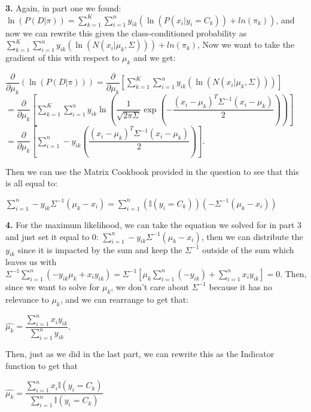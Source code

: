 \documentclass[submit]{harvardml}
\begin{document}
 \textbf{3.} Again, in part one we found: $\ln(P(D | \pi)) = \sum_{k=1}^{K} \sum_{i=1}^{n} y_{ik}(\ln(P(x_i | y_i = C_k)) + ln(\pi_k))$, and now we can rewrite this given the class-conditioned probability as $\sum_{k=1}^{K} \sum_{i=1}^{n} y_{ik}(\ln(N(x_i | \mu_k, \Sigma))) + ln(\pi_k)$, 
 Now we want to take the gradient of this with respect to $\mu_k$ and we get: 
 \begin{center}
  $\dfrac{\partial}{\partial \mu_k} (\ln(P(D | \pi))) = \dfrac{\partial}{\partial \mu_k} [\sum_{k=1}^{K} \sum_{i=1}^{n} y_{ik}(\ln(N(x_i | \mu_k, \Sigma)))]$ \\
  $= \dfrac{\partial}{\partial \mu_k}[\sum_{k=1}^{K} \sum_{i=1}^{n} y_{ik} \ln(\dfrac{1}{\sqrt{2\pi\Sigma}} \exp(-\dfrac{(x_i - \mu_k)^T \Sigma^{-1} (x_i - \mu_k)}{2}))]$ \\
  $= \dfrac{\partial}{\partial \mu_k}[\sum_{i=1}^{n}-y_{ik}(\dfrac{(x_i - \mu_k)^T \Sigma^{-1} (x_i - \mu_k)}{2})]$.
 \end{center}
 Then we can use the Matrix Cookbook provided in the question to see that this is all equal to: 
 \begin{center}
    $\sum_{i=1}^{n} -y_{ik} \Sigma^{-1} (\mu_k - x_i) = \sum_{i=1}^{n} (\mathbb{I}(y_i = C_k))(-\Sigma^{-1} (\mu_k - x_i))$
 \end{center}

 \textbf{4.} For the maximum likelihood, we can take the equation we solved for in part 3 and just set it equal to 0: $\sum_{i=1}^{n} -y_{ik} \Sigma^{-1} (\mu_k - x_i)$, then we can 
 distribute the $y_{ik}$ since it is impacted by the sum and keep the $\Sigma^{-1}$ outside of the sum which leaves us with $\Sigma^{-1} \sum_{i=1}^{n}(-y_{ik}\mu_k + x_i y_{ik}) = \Sigma^{-1} [\mu_k\sum_{i=1}^{n}(-y_{ik}) + \sum_{i=1}^{n} x_i y_{ik}] = 0$.
 Then, since we want to solve for $\mu_k$, we don't care about $\Sigma^{-1}$ because it has no relevance to $\mu_k$, and we can rearrange to get that: 
 \begin{center}
    $\hat{\mu_k} = \dfrac{\sum_{i=1}^{n} x_i y_{ik}}{\sum_{i=1}^{n} y_{ik}}$.
 \end{center}
 Then, just as we did in the last part, we can rewrite this as the Indicator function to get that 
 \begin{center}
    $\hat{\mu_k} = \dfrac{\sum_{i=1}^{n} x_i \mathbb{I}(y_i = C_k)}{\sum_{i=1}^{n} \mathbb{I}(y_i = C_k)}$
 \end{center}
\end{document}
